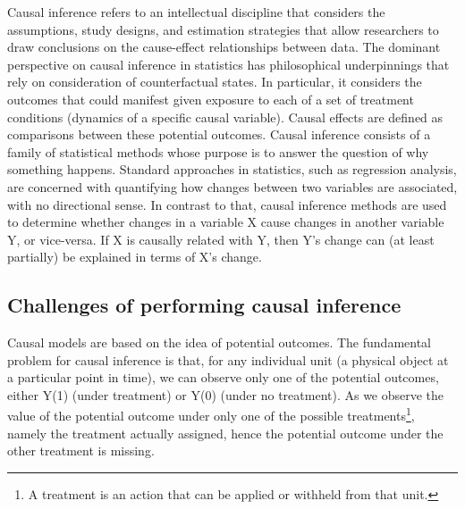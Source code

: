 \documentclass[%
 aps,
 jmp,%
 amsmath,amssymb,
 reprint,%
]{revtex4-2}
\begin{document}
Causal inference refers to an intellectual discipline that considers the assumptions, study designs, and estimation strategies that allow researchers to draw conclusions on the cause-effect relationships between data. 
The dominant perspective on causal inference in statistics has philosophical underpinnings that rely on consideration of counterfactual states. 
In particular, it considers the outcomes that could manifest given exposure to each of a set of treatment conditions (dynamics of a specific causal variable). 
Causal effects are defined as comparisons between these potential outcomes. 
Causal inference consists of a family of statistical methods whose purpose is to answer the question of why something happens. 
Standard approaches in statistics, such as regression analysis, are concerned with quantifying how changes between two variables are associated, with no directional sense. 
In contrast to that, causal inference methods are used to determine whether changes in a variable X cause changes in another variable Y, or vice-versa. 
If X is causally related with Y, then Y's change can (at least partially) be explained in terms of X's change.

\subsection{Challenges of performing causal inference}


Causal models are based on the idea of potential outcomes. 
The fundamental problem for causal inference is that, for any individual unit (a physical object at a particular point in time), we can observe only one of the potential outcomes, either Y(1) (under treatment) or Y(0) (under no treatment). 
As we observe the value of the potential outcome under only one of the possible treatments\footnote{A treatment is an action that can be applied or withheld from that unit.}, namely the treatment actually assigned, hence the potential outcome under the other treatment is missing.
\end{document}
